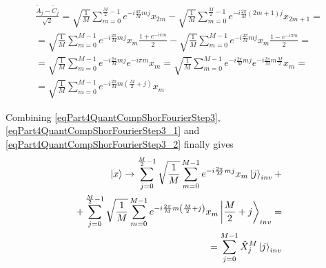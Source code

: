 \begin{eqnarray}
\frac{\tilde{A}_{j} - \tilde{C}_{j} }{\sqrt{2}} = 
\sqrt{\frac{1}{M}} 
\sum_{m = 0}^{\frac{M}{2} - 1} e^{-i \frac{4 \pi}{M} m j} x_{2m}  -
\sqrt{\frac{1}{M}} 
\sum_{m = 0}^{\frac{M}{2} - 1} 
e^{-i \frac{2 \pi}{M} \left(2m+1\right) j} x_{2m+1}
= 
\nonumber \\
=
\sqrt{\frac{1}{M}} \sum_{m = 0}^{M - 1}
e^{-i \frac{2 \pi}{M} m j} x_{m} \frac{1 + e^{-i \pi m}}{2}
-
\sqrt{\frac{1}{M}} \sum_{m = 0}^{M - 1}
e^{-i \frac{2 \pi}{M} m j} x_{m} \frac{1 - e^{-i \pi m}}{2} 
=
\nonumber \\
=
\sqrt{\frac{1}{M}} \sum_{m = 0}^{M - 1}
e^{-i \frac{2 \pi}{M} m j} e^{-i \pi m } x_{m} 
=
\sqrt{\frac{1}{M}} \sum_{m = 0}^{M - 1}
e^{-i \frac{2 \pi}{M} m j} e^{-i \frac{2 \pi}{M} m \frac{M}{2} } x_{m} 
=
\nonumber \\
=
\sqrt{\frac{1}{M}} \sum_{m = 0}^{M - 1}
e^{-i \frac{2 \pi}{M} m \left(\frac{M}{2} + j\right)} x_{m}
\label{eqPart4QuantCompShorFourierStep3_2}
\end{eqnarray}

Combining \eqref{eqPart4QuantCompShorFourierStep3}, 
\eqref{eqPart4QuantCompShorFourierStep3_1} and
\eqref{eqPart4QuantCompShorFourierStep3_2} finally gives 
\begin{eqnarray}
\ket{x} \rightarrow
\sum_{j = 0}^{\frac{M}{2} - 1} \sqrt{\frac{1}{M}} \sum_{m = 0}^{M - 1}
e^{-i \frac{2 \pi}{M} m j} x_{m} \ket{j}_{inv} +
\nonumber \\
+
\sum_{j = 0}^{\frac{M}{2} - 1} \sqrt{\frac{1}{M}} \sum_{m = 0}^{M - 1}
e^{-i \frac{2 \pi}{M} m \left(\frac{M}{2} + j\right)} x_{m} 
\left|\frac{M}{2} + j\right>_{inv} =
\nonumber \\
= \sum_{j = 0}^{M - 1} \tilde{X}_j^{M} \ket{j}_{inv}
\nonumber
\end{eqnarray}